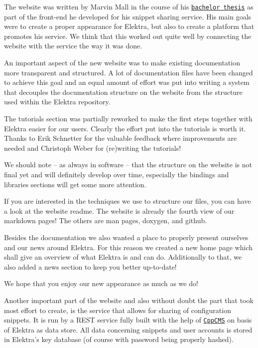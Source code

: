 The website was written by Marvin Mall in the course of his \href{https://www.libelektra.org/ftp/elektra/mall2016rest.pdf}{\tt bachelor thesis} as part of the front-\/end he developed for his snippet sharing service. His main goals were to create a proper appearance for Elektra, but also to create a platform that promotes his service. We think that this worked out quite well by connecting the website with the service the way it was done.

An important aspect of the new website was to make existing documentation more transparent and structured. A lot of documentation files have been changed to achieve this goal and an equal amount of effort was put into writing a system that decouples the documentation structure on the website from the structure used within the Elektra repository.

The tutorials section was partially reworked to make the first steps together with Elektra easier for our users. Clearly the effort put into the tutorials is worth it. Thanks to Erik Schnetter for the valuable feedback where improvements are needed and Christoph Weber for (re)writing the tutorials!

We should note -- as always in software -- that the structure on the website is not final yet and will definitely develop over time, especially the bindings and libraries sections will get some more attention.

If you are interested in the techniques we use to structure our files, you can have a look at the website readme. The website is already the fourth view of our markdown pages! The others are man pages, doxygen, and github.

Besides the documentation we also wanted a place to properly present ourselves and our news around Elektra. For this reason we created a new home page which shall give an overview of what Elektra is and can do. Additionally to that, we also added a news section to keep you better up-\/to-\/date!

We hope that you enjoy our new appearance as much as we do!

Another important part of the website and also without doubt the part that took most effort to create, is the service that allows for sharing of configuration snippets. It is run by a R\+E\+ST service fully built with the help of \href{http://cppcms.com/}{\tt Cpp\+C\+MS} on basis of Elektra as data store. All data concerning snippets and user accounts is stored in Elektra’s key database (of course with password being properly hashed).

